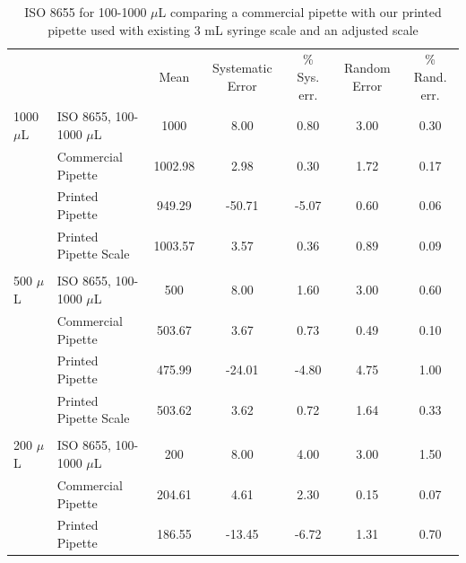 \documentclass[10pt,letterpaper]{article}
\begin{document}
\begin{table}[!ht]
	\begin{adjustwidth}{-2.25in}{0in} %
		\centering
		\caption{ISO 8655 for 100-1000 $\mu$L comparing a commercial pipette with our printed pipette used with existing 3 mL syringe scale and an adjusted scale}
		\label{table3}
		\begin{tabular}{llccccc}
			&                       & Mean   & Systematic Error & \% Sys. err. & Random Error & \% Rand. err. \\
			1000 $\mu$L & ISO 8655, 100-1000 $\mu$L & 1000    & 8.00             & 0.80         & 3.00         & 0.30          \\
			& Commercial Pipette    & 1002.98 & 2.98             & 0.30         & 1.72         & 0.17          \\
			& Printed Pipette       & 949.29  & -50.71           & -5.07        & 0.60         & 0.06          \\
			& Printed Pipette Scale & 1003.57 & 3.57             & 0.36         & 0.89         & 0.09          \\
			&                       &         &                  &              &              &               \\
			500 $\mu$L  & ISO 8655, 100-1000 $\mu$L & 500     & 8.00             & 1.60         & 3.00         & 0.60          \\
			& Commercial Pipette    & 503.67  & 3.67             & 0.73         & 0.49         & 0.10          \\
			& Printed Pipette       & 475.99  & -24.01           & -4.80        & 4.75         & 1.00          \\
			& Printed Pipette Scale & 503.62  & 3.62             & 0.72         & 1.64         & 0.33          \\
			&                       &         &                  &              &              &               \\
			200 $\mu$L  & ISO 8655, 100-1000 $\mu$L & 200     & 8.00             & 4.00         & 3.00         & 1.50          \\
			& Commercial Pipette    & 204.61  & 4.61             & 2.30         & 0.15         & 0.07          \\
			& Printed Pipette       & 186.55  & -13.45           & -6.72        & 1.31         & 0.70          \\

\end{tabular}
\end{adjustwidth}
\end{table}
\end{document}
